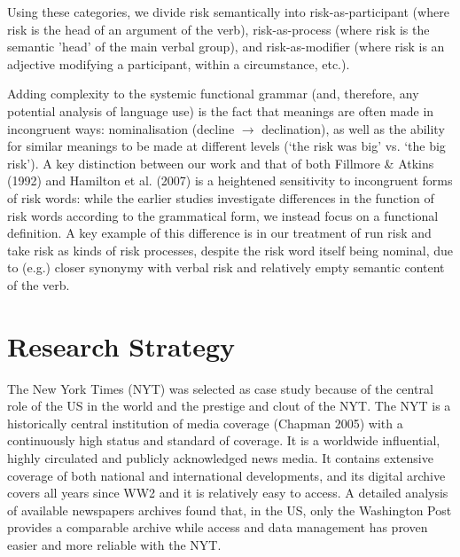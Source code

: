 
Using these categories, we divide risk semantically into risk-as-participant (where risk is the head of an argument of the verb), risk-as-process (where risk is the semantic 'head' of the main verbal group), and risk-as-modifier (where risk is an adjective modifying a participant, within a circumstance, etc.).

Adding complexity to the systemic functional grammar (and, therefore, any potential analysis of language use) is the fact that meanings are often made in incongruent ways: nominalisation (decline $\rightarrow$ declination), as well as the ability for similar meanings to be made at different levels (`the risk was big' vs. `the big risk'). A key distinction between our work and that of both Fillmore \& Atkins (1992) and Hamilton et al. (2007) is a heightened sensitivity to incongruent forms of risk words: while the earlier studies investigate differences in the function of risk words according to the grammatical form, we instead focus on a functional definition. A key example of this difference is in our treatment of run risk and take risk as kinds of risk processes, despite the risk word itself being nominal, due to (e.g.) closer synonymy with verbal risk and relatively empty semantic content of the verb. 

\section{Research Strategy}

The New York Times (NYT) was selected as case study because of the central role of the US in the world and the prestige and clout of the NYT. The NYT is a historically central institution of media coverage (Chapman 2005) with a continuously high status and standard of coverage. It is a worldwide influential, highly circulated and publicly acknowledged news media. It contains extensive coverage of both national and international developments, and its digital archive covers all years since WW2 and it is relatively easy to access. A detailed analysis of available newspapers archives found that, in the US, only the Washington Post provides a comparable archive while access and data management has proven easier and more reliable with the NYT. 

